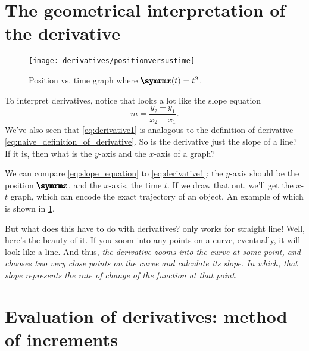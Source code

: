 \section{The geometrical interpretation of the derivative}

\begin{wrapfigure}[15]{l}{0.4\textwidth}
        \centering
        \texttt{[image: derivatives/positionversustime]}
        \caption{Position vs. time graph where $\protect\vv{x}(t) = t^2$.}
        \label{fig:position_versus_time}
\end{wrapfigure}

To interpret derivatives, notice that  looks a lot like the slope equation
\begin{equation}
    m = \frac{y_2 - y_1}{x_2 - x_1}. \label{eq:slope_equation}
\end{equation}
We've also seen that \cref{eq:derivative1} is analogous to the definition of derivative \cref{eq:naive_definition_of_derivative}. So is the derivative just the slope of a line? If it is, then what is the $y$-axis and the $x$-axis of a graph?

We can compare \cref{eq:slope_equation} to \cref{eq:derivative1}: the $y$-axis should be the position $\vv{x}$, and the $x$-axis, the time $t$. If we draw that out, we'll get the $x$-$t$ graph, which can encode the exact trajectory of an object. An example of which is shown in \cref{fig:position_versus_time}.

But what does this have to do with derivatives?  only works for straight line! Well, here's the beauty of it. If you zoom into any points on a curve, eventually, it will look like a line. And thus, \emph{the derivative zooms into the curve at some point, and chooses two very close points on the curve and calculate its slope. In which, that slope represents the rate of change of the function at that point.}

\section{Evaluation of derivatives: method of increments}

